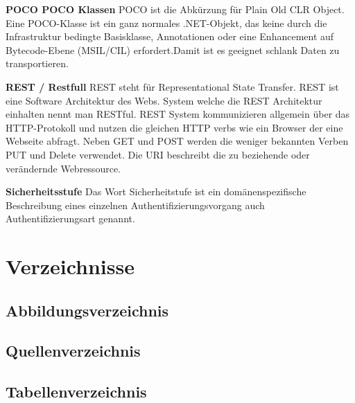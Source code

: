 \textbf{POCO POCO Klassen} POCO ist die Abkürzung für Plain Old CLR
Object. Eine POCO-Klasse ist ein ganz normales .NET-Objekt, das keine
durch die Infrastruktur bedingte Basisklasse, Annotationen oder eine
Enhancement auf Bytecode-Ebene (MSIL/CIL) erfordert.Damit ist es
geeignet schlank Daten zu transportieren.

\textbf{REST / Restfull} REST steht für Representational State Transfer.
REST ist eine Software Architektur des Webs. System welche die REST
Architektur einhalten nennt man RESTful. REST System kommunizieren
allgemein über das HTTP-Protokoll und nutzen die gleichen HTTP verbs wie
ein Browser der eine Webseite abfragt. Neben GET und POST werden die
weniger bekannten Verben PUT und Delete verwendet. Die URI beschreibt
die zu beziehende oder verändernde Webressource.

\textbf{Sicherheitsstufe} Das Wort Sicherheitstufe ist ein
domänenspezifische Beschreibung eines einzelnen
Authentifizierungsvorgang auch Authentifizierungsart genannt.

\chapter{Verzeichnisse}\label{verzeichnisse}

\section{Abbildungsverzeichnis}\label{abbildungsverzeichnis}

\renewcommand{\listfigurename}{} 

\begingroup\let\clearpage\relax
\listoffigures
\endgroup

\pagebreak

\section{Quellenverzeichnis}\label{quellenverzeichnis}

\renewcommand{\bibname}{}

\begingroup \let\clearpage\relax
\printbibliography
\endgroup

\pagebreak

\section{Tabellenverzeichnis}\label{tabellenverzeichnis}

\renewcommand{\listtablename}{} 

